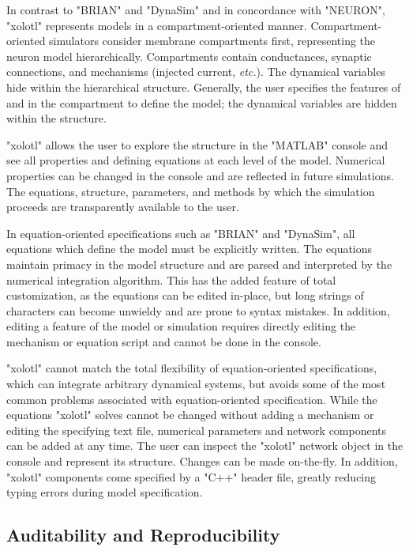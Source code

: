 \documentclass{frontiersSCNS} %
\newcommand{\etc}{\textit{etc.}\xspace}
\begin{document}
In contrast to "BRIAN" and "DynaSim" and in concordance with "NEURON", "xolotl" represents models in a compartment-oriented manner. Compartment-oriented simulators consider membrane compartments first, representing the neuron model hierarchically. Compartments contain conductances, synaptic connections, and mechanisms (injected current, \etc). The dynamical variables hide within the hierarchical structure. Generally, the user specifies the features of and in the compartment to define the model; the dynamical variables are hidden within the structure. 

"xolotl" allows the user to explore the structure in the "MATLAB" console and see all properties and defining equations at each level of the model. Numerical properties can be changed in the console and are reflected in future simulations. The equations, structure, parameters, and methods by which the simulation proceeds are transparently available to the user. 

In equation-oriented specifications such as "BRIAN" and "DynaSim", all equations which define the model must be explicitly written. The equations maintain primacy in the model structure and are parsed and interpreted by the numerical integration algorithm. This has the added feature of total customization, as the equations can be edited in-place, but long strings of characters can become unwieldy and are prone to syntax mistakes. In addition, editing a feature of the model or simulation requires directly editing the mechanism or equation script and cannot be done in the console. 

"xolotl" cannot match the total flexibility of equation-oriented specifications, which can integrate arbitrary dynamical systems, but avoids some of the most common problems associated with equation-oriented specification. While the equations "xolotl" solves cannot be changed without adding a mechanism or editing the specifying text file, numerical parameters and network components can be added at any time. The user can inspect the "xolotl" network object in the console and represent its structure. Changes can be made on-the-fly. In addition, "xolotl" components come specified by a "C++" header file, greatly reducing typing errors during model specification.

\subsection{Auditability and Reproducibility}
\end{document}
